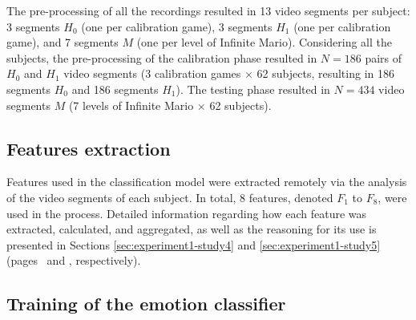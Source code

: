 The pre-processing of all the recordings resulted in 13 video segments per subject: 3 segments $H_0$ (one per calibration game), 3 segments $H_1$ (one per calibration game), and 7 segments $M$ (one per level of Infinite Mario). Considering all the subjects, the pre-processing of the calibration phase resulted in $N=186$ pairs of $H_0$ and $H_1$ video segments (3 calibration games $\times$ 62 subjects, resulting in 186 segments $H_0$ and 186 segments $H_1$). The testing phase resulted in $N=434$ video segments $M$ (7 levels of Infinite Mario $\times$ 62 subjects).

\subsection{Features extraction}

Features used in the classification model were extracted remotely via the analysis of the video segments of each subject. In total, 8 features, denoted $F_1$ to $F_8$, were used in the process. Detailed information regarding how each feature was extracted, calculated, and aggregated, as well as the reasoning for its use is presented in Sections \ref{sec:experiment1-study4} and \ref{sec:experiment1-study5} (pages \pageref{sec:experiment1-study4}\ and \pageref{sec:experiment1-study5}, respectively).


\subsection{Training of the emotion classifier}

